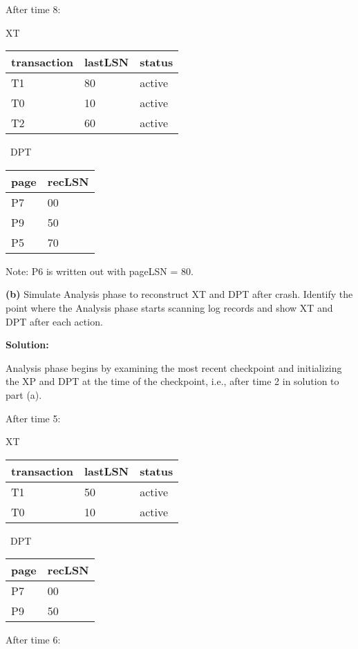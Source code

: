 \documentclass[11pt]{article}
\renewcommand\part[1]{\vspace{.10in}\textbf{(#1)}}
\begin{document}
After time 8:

XT   \begin{tabular}{ |l |l |l |}\hline
  transaction & lastLSN & status \\\hline
  T1 & 80 & active  \\\hline
  T0 & 10 & active  \\\hline
  T2 & 60 & active  \\\hline
  \end{tabular} 
 \ DPT \begin{tabular}{ |l |l |}\hline
    page & recLSN \\\hline
    P7 & 00  \\\hline
    P9 & 50  \\\hline
    P5 & 70  \\\hline
    \end{tabular}

Note: P6 is written out with pageLSN = 80.

  \part{b} Simulate Analysis phase to reconstruct XT and DPT after crash. Identify the point where the Analysis phase starts scanning 
  log records and show XT and DPT after each action.
 
{\bf Solution:}
  
  Analysis phase begins by examining the most recent checkpoint and
  initializing the XP and DPT at the time of the checkpoint, i.e.,
  after time 2 in solution to part (a).
  
  After time 5:
  
  XT   \begin{tabular}{ |l |l |l |}\hline
    transaction & lastLSN & status \\\hline
    T1 & 50 & active  \\\hline
    T0 & 10 & active  \\\hline
    \end{tabular} 
   \ DPT \begin{tabular}{ |l |l |}\hline
      page & recLSN \\\hline
      P7 & 00  \\\hline
      P9 & 50  \\\hline
      \end{tabular}
  
  After time 6:
  
\end{document}
